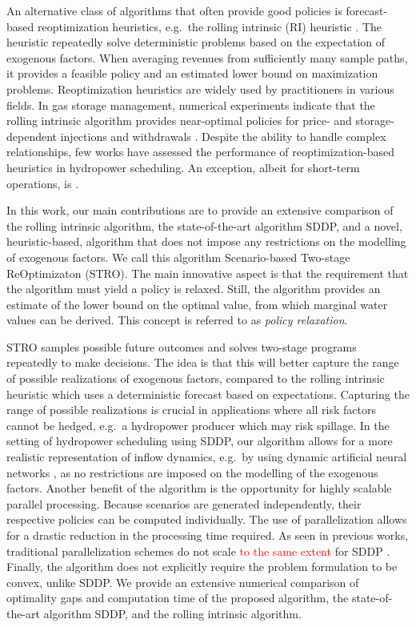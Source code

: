 An alternative class of algorithms that often provide good policies is forecast-based reoptimization heuristics, e.g.\ the rolling intrinsic (RI) heuristic \cite{breslin2009gas}. The heuristic repeatedly solve deterministic problems based on the expectation of exogenous factors. When averaging revenues from sufficiently many sample paths, it provides a feasible policy and an estimated lower bound on maximization problems. Reoptimization heuristics are widely used by practitioners in various fields. In gas storage management, numerical experiments indicate that the rolling intrinsic algorithm provides near-optimal policies for price- and storage-dependent injections and withdrawals \cite{lai2010a,wu2012a}. Despite the ability to handle complex relationships, few works have assessed the performance of reoptimization-based heuristics in hydropower scheduling. An exception, albeit for short-term operations, is \cite{LoWa20}.

In this work, our main contributions are to provide an extensive comparison of the rolling intrinsic algorithm, the state-of-the-art algorithm SDDP, and a novel, heuristic-based, algorithm that does not impose any restrictions on the modelling of exogenous factors. We call this algorithm Scenario-based Two-stage ReOptimizaton (STRO). The main innovative aspect is that the requirement that the algorithm must yield a policy is relaxed. Still, the algorithm provides an estimate of the lower bound on the optimal value, from which marginal water values can be derived. This concept is referred to as \emph{policy relaxation}.

STRO samples possible future outcomes and solves two-stage programs repeatedly to make decisions. The idea is that this will better capture the range of possible realizations of exogenous factors, compared to the rolling intrinsic heuristic which uses a deterministic forecast based on expectations. Capturing the range of possible realizations is crucial in applications where all risk factors cannot be hedged, e.g.\ a hydropower producer which may risk spillage. In the setting of hydropower scheduling using SDDP, our algorithm allows for a more realistic representation of inflow dynamics, e.g.\ by using dynamic artificial neural networks \cite{Valipour2012}, as no restrictions are imposed on the modelling of the exogenous factors. Another benefit of the algorithm is the opportunity for highly scalable parallel processing. Because scenarios are generated independently, their respective policies can be computed individually. The use of parallelization allows for a drastic reduction in the processing time required. As seen in previous works, traditional parallelization schemes do not scale \textcolor{red}{to the same extent} for SDDP \cite{AvPL21,helseth_braaten_2015}. Finally, the algorithm does not explicitly require the problem formulation to be convex, unlike SDDP. We provide an extensive numerical comparison of optimality gaps and computation time of the proposed algorithm, the state-of-the-art algorithm 
SDDP, and the rolling intrinsic algorithm. 

